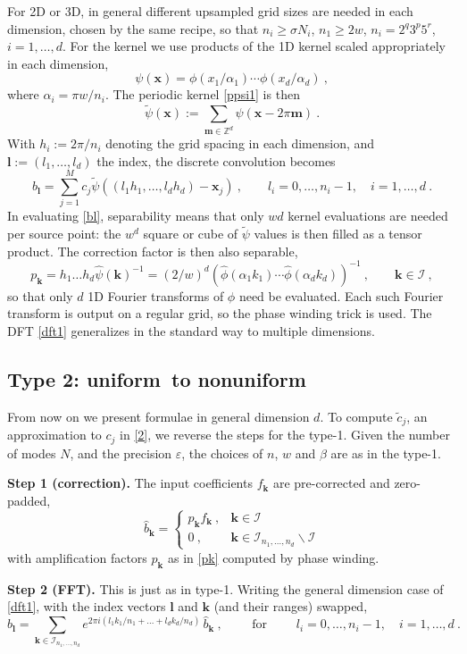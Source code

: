 \documentclass[10pt]{article}
\newcommand{\be}{\begin{equation}}
\newcommand{\ee}{\end{equation}}
\newcommand{\mbf}[1]{{\mathbf #1}}
\newcommand{\ZZ}{\mathbb{Z}}
\newcommand{\eps}{\varepsilon}
\newcommand{\xx}{\mbf{x}}
\newcommand{\kk}{\mbf{k}}
\newcommand{\KK}{{\mathcal I}}     %
\newcommand{\rat}{\sigma}          %
\newcommand{\ppsi}{{\tilde\psi}}   %
\newcommand{\al}{\alpha}           %
\newcommand{\NU}{{nonuniform}}       %
\newcommand{\U}{{uniform}}
\begin{document}
For 2D or 3D, in general different
upsampled grid sizes are needed in each dimension,
chosen by the same recipe, so that $n_i \ge \rat N_i$, $n_1 \ge 2w$,
$n_i = 2^q3^p5^r$, $i=1,\dots,d$.
For the kernel we use products of the 1D kernel scaled appropriately
in each dimension,
\be
\psi(\xx) = \phi(x_1/\al_1) \cdots \phi(x_d/\al_d)
~,
\ee
where $\al_i=\pi w/n_i$.
The periodic kernel \eqref{ppsi1} is then
\be
\ppsi(\xx) := \sum_{\mbf{m} \in \ZZ^d} \psi(\xx - 2\pi\mbf{m})
~.
\label{ppsi}
\ee
With $h_i:=2\pi/n_i$ denoting the grid spacing in each dimension,
and $\mbf{l}:=(l_1,\dots,l_d)$ the index,
the discrete convolution %
becomes
\be
b_\mbf{l} = \sum_{j=1}^M c_j \ppsi((l_1h_1,\dots,l_dh_d)-\xx_j)~,
\qquad l_i=0,\dots,n_i-1, \quad i=1,\dots,d
~.
\label{bl}
\ee
In evaluating \eqref{bl}, separability
means that only $wd$ kernel evaluations are needed per source point:
the $w^d$ square or cube of $\ppsi$ values is then filled as a tensor product.
The correction factor is then also separable,
\be
p_\kk = h_1\dots h_d \hat\psi(\kk)^{-1} = (2/w)^{d}
(\hat\phi(\al_1 k_1) \cdots \hat\phi(\al_d k_d))^{-1}
~, \qquad \kk \in \KK~,
\label{pk}
\ee
so that only $d$ 1D Fourier transforms of $\phi$ need be evaluated.
Each such Fourier transform is output on a regular grid, so the phase winding
trick is used.
The DFT \eqref{dft1} generalizes in the standard way to
multiple dimensions.



\subsection{Type 2: \U\ to \NU}
\label{s:2}

From now on we present formulae in general dimension $d$.
To compute $\tilde c_j$, an approximation to $c_j$ in \eqref{2},
we reverse the steps for the type-1.
Given the number of modes $N$, and the precision $\eps$,
the choices of $n$, $w$ and $\beta$ are as in the type-1.

{\bf Step 1 (correction).}
The input coefficients $f_\kk$ are pre-corrected and zero-padded,
\be
\hat b_\kk = \left\{\begin{array}{ll}p_\kk f_\kk~, & \kk \in \KK \\
0~, & \kk \in \KK_{n_1,\dots,n_d} \backslash \KK
\end{array}\right.
\ee
with amplification factors $p_\kk$ as in \eqref{pk} computed by phase winding.

{\bf Step 2 (FFT).}
This is just as in type-1. Writing the general dimension
case of \eqref{dft1}, with the index vectors $\mbf{l}$
and $\kk$ (and their ranges) swapped,
\be
b_\mbf{l} = \sum_{\kk\in\KK_{n_1,\dots,n_d}}
e^{2\pi i (l_1k_1/n_1 + \dots + l_dk_d/n_d)}
\,\hat b_\kk ~, \qquad \mbox{ for }
\qquad l_i=0,\dots,n_i-1, \quad i=1,\dots,d
~.
\label{dft}
\ee
\end{document}
